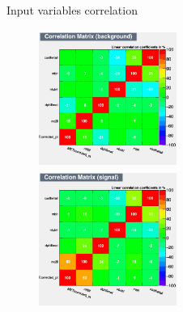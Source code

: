 \documentclass[8pt]{beamer}
\begin{document}
\begin{frame}{Input variables correlation}
\justifying
\begin{figure}[htbp]
\centering
\begin{minipage}[b]{.49\textwidth}
\begin{center}
\includegraphics[width=4.5cm, height=4.5cm]{figs/corr_background.png}
\end{center}
\end{minipage}\hfill
\begin{minipage}[b]{.49\textwidth}
\begin{center}
\includegraphics[width=4.5cm, height=4.5cm]{figs/corr_signal.png}
\end{center}
\end{minipage} \hfill
\end{figure}
\end{frame}
\end{document}
